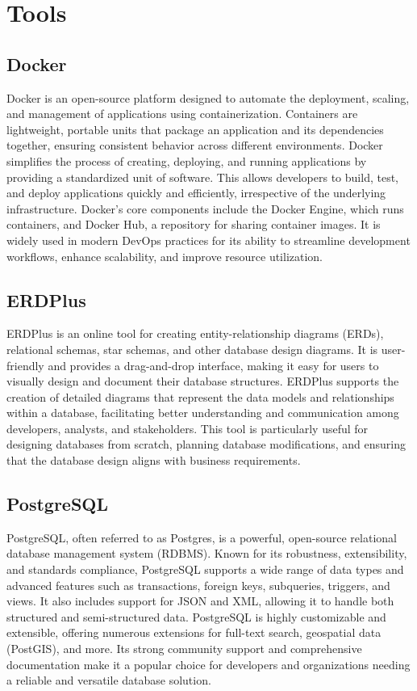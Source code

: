 \documentclass[12pt]{report}
\begin{document}
\chapter{Tools}

\section{Docker}

Docker is an open-source platform designed to automate the deployment, scaling, and management of applications using containerization. Containers are lightweight, portable units that package an application and its dependencies together, ensuring consistent behavior across different environments. Docker simplifies the process of creating, deploying, and running applications by providing a standardized unit of software. This allows developers to build, test, and deploy applications quickly and efficiently, irrespective of the underlying infrastructure. Docker's core components include the Docker Engine, which runs containers, and Docker Hub, a repository for sharing container images. It is widely used in modern DevOps practices for its ability to streamline development workflows, enhance scalability, and improve resource utilization.

\section{ERDPlus}

ERDPlus is an online tool for creating entity-relationship diagrams (ERDs), relational schemas, star schemas, and other database design diagrams. It is user-friendly and provides a drag-and-drop interface, making it easy for users to visually design and document their database structures. ERDPlus supports the creation of detailed diagrams that represent the data models and relationships within a database, facilitating better understanding and communication among developers, analysts, and stakeholders. This tool is particularly useful for designing databases from scratch, planning database modifications, and ensuring that the database design aligns with business requirements.

\section{PostgreSQL}

PostgreSQL, often referred to as Postgres, is a powerful, open-source relational database management system (RDBMS). Known for its robustness, extensibility, and standards compliance, PostgreSQL supports a wide range of data types and advanced features such as transactions, foreign keys, subqueries, triggers, and views. It also includes support for JSON and XML, allowing it to handle both structured and semi-structured data. PostgreSQL is highly customizable and extensible, offering numerous extensions for full-text search, geospatial data (PostGIS), and more. Its strong community support and comprehensive documentation make it a popular choice for developers and organizations needing a reliable and versatile database solution.
\end{document}
